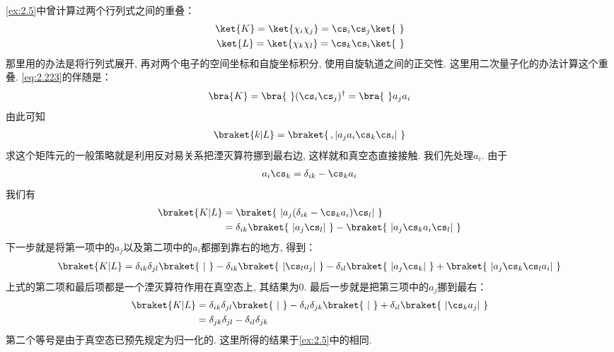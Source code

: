 \autoref{ex:2.5}中曾计算过两个行列式之间的重叠：
\begin{align}\label{eq:2.223}
\ket{K} = \ket{\chi_i\chi_j} = \cs_i\cs_j\ket{\,\,}\\
\ket{L} = \ket{\chi_k\chi_l} = \cs_k\cs_i\ket{\,\,}
\label{eq:2.224}
\end{align}
那里用的办法是将行列式展开, 
再对两个电子的空间坐标和自旋坐标积分, 
使用自旋轨道之间的正交性. 
这里用二次量子化的办法计算这个重叠. 
\autoref{eq:2.223}的伴随是：
\begin{align}
\bra{K} = \bra{\,\,}(\cs_i\cs_j)^\dagger = \bra{\,\,}a_ja_i
\end{align}
由此可知
\begin{align}
\braket{k|L} = \braket{\,,|a_ja_i\cs_k\cs_i|\,\,}
\end{align}
求这个矩阵元的一般策略就是利用反对易关系把湮灭算符挪到最右边, 
这样就和真空态直接接触. 
我们先处理$a_i$. 
由于
\begin{align}
a_i\cs_k = \delta_{ik} - \cs_ka_i
\end{align}
我们有
\begin{align}\nonumber
\braket{K|L} & = \braket{\,\,|a_j(\delta_{ik}-\cs_ka_i)\cs_l|\,\,}\\
             & = \delta_{ik}\braket{\,\,|a_j\cs_l|\,\,} - \braket{\,\,|a_j\cs_ka_i\cs_l|\,\,}
\end{align}
下一步就是将第一项中的$a_j$以及第二项中的$a_i$都挪到靠右的地方, 
得到：
\begin{align}
\braket{K|L} = \delta_{ik}\delta_{jl} \braket{\,\,|\,\,} - \delta_{ik}\braket{\,\,|\cs_la_j|\,\,} - \delta_{il}\braket{\,\,|a_j\cs_k|\,\,} + \braket{\,\,|a_j\cs_k\cs_la_i|\,\,}
\end{align}
上式的第二项和最后项都是一个湮灭算符作用在真空态上, 
其结果为$0$. 
最后一步就是把第三项中的$a_j$挪到最右：
\begin{align}
\braket{K|L} & = \delta_{ik}\delta_{jl} \braket{\,\,|\,\,} - \delta_{il}\delta_{jk}\braket{\,\,|\,\,} + \delta_{il}\braket{\,\,|\cs_ka_j|\,\,}\notag\\
& = \delta_{jk}\delta_{jl} - \delta_{il}\delta_{jk}
\end{align}
第二个等号是由于真空态已预先规定为归一化的. 
这里所得的结果于\autoref{ex:2.5}中的相同. 

